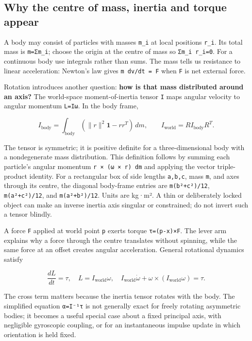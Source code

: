 \subsection{Why the centre of mass, inertia and torque appear}\label{02-foundations-ii-ch039-why-the-centre-of-mass-inertia-and-torque-appear}

A body may consist of particles with masses \texttt{m\_i} at local positions \texttt{r\_i}. Its total mass is \texttt{m=Σm\_i}; choose the origin at the centre of mass so \texttt{Σm\_i\ r\_i=0}. For a continuous body use integrals rather than sums. The mass tells us resistance to linear acceleration: Newton's law gives \texttt{m\ dv/dt\ =\ F} when \texttt{F} is net external force.

Rotation introduces another question: \textbf{how is that mass distributed around an axis?} The world-space moment-of-inertia tensor \texttt{I} maps angular velocity to angular momentum \texttt{L=Iω}. In the body frame,

\[
I_{\mathrm{body}}=\int_{\mathrm{body}}(\|r\|^2\mathbf{1}-rr^T)\,dm,
\qquad I_{\mathrm{world}}=R I_{\mathrm{body}}R^T.
\]

The tensor is symmetric; it is positive definite for a three-dimensional body with a nondegenerate mass distribution. This definition follows by summing each particle's angular momentum \texttt{r\ ×\ (ω\ ×\ r)\ dm} and applying the vector triple-product identity. For a rectangular box of side lengths \texttt{a,b,c}, mass \texttt{m}, and axes through its centre, the diagonal body-frame entries are \texttt{m(b²+c²)/12}, \texttt{m(a²+c²)/12}, and \texttt{m(a²+b²)/12}. Units are kg·m². A thin or deliberately locked object can make an inverse inertia axis singular or constrained; do not invert such a tensor blindly.

A force \texttt{F} applied at world point \texttt{p} exerts torque \texttt{τ=(p-x)×F}. The lever arm explains why a force through the centre translates without spinning, while the same force at an offset creates angular acceleration. General rotational dynamics satisfy

\[
\frac{dL}{dt}=\tau,\quad L=I_{\mathrm{world}}\omega,\quad
I_{\mathrm{world}}\dot\omega+\omega\times(I_{\mathrm{world}}\omega)=\tau .
\]

The cross term matters because the inertia tensor rotates with the body. The simplified equation \texttt{α=I⁻¹τ} is not generally exact for freely rotating asymmetric bodies; it becomes a useful special case about a fixed principal axis, with negligible gyroscopic coupling, or for an instantaneous impulse update in which orientation is held fixed.

